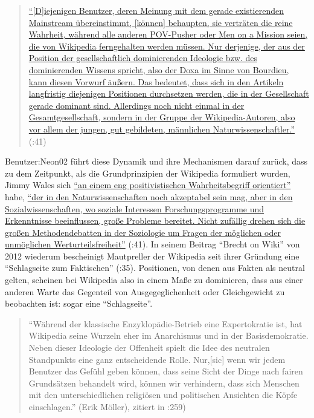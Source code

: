 \documentclass[fontsize=12pt]{scrartcl}
\begin{document}
\singlespacing
\begin{quote}
\href{https://commons.wikimedia.org/w/index.php?title=File:Allesueberwikipedia.pdf\&page=41}{"`[D]iejenigen Be\-nut\-zer, deren Meinung mit dem gerade existierenden Mainstream \"ubereinstimmt, [k\"onnen] behaupten, sie vertr\"aten die reine Wahrheit, w\"ahrend alle anderen \flq \href{https://de.wikipedia.org/wiki/Wikipedia:Neutraler_Standpunkt}{POV}-Pusher\frq \,\,oder \flq Men on a Mission\frq \,\,seien, die von Wi\-ki\-pe\-dia ferngehalten werden m\"ussen. Nur derjenige, der aus der Position der ge\-sell\-schaftlich dominierenden Ideologie bzw. des dominierenden Wissens spricht, also der Doxa im Sinne von Bourdieu, kann diesen Vorwurf \"au{\ss}ern. Das bedeutet, dass sich in den Artikeln langfristig diejenigen Positionen durchsetzen werden, die in der Ge\-sell\-schaft gerade dominant sind. Al\-ler\-dings noch nicht einmal in der Gesamtge\-sell\-schaft, sondern in der Gruppe der Wi\-ki\-pe\-dia-Autoren, also vor allem der jungen, gut gebildeten, m\"annlichen Naturwissenschaftler."'} (\cite{BenutzerNeon022011}:41)
\end{quote}
\onehalfspacing

Benutzer:Neon02 f\"uhrt diese Dynamik und ihre Mechanismen darauf zur\"uck, dass zu dem Zeitpunkt, als die Grundprinzipien der Wi\-ki\-pe\-dia formuliert wurden, Jimmy Wales sich \href{https://commons.wikimedia.org/w/index.php?title=File:Allesueberwikipedia.pdf\&page=41}{"`an einem eng positivistischen Wahrheitsbegriff orientiert"'} habe, \href{https://commons.wikimedia.org/w/index.php?title=File:Allesueberwikipedia.pdf\&page=41}{"`der in den Naturwissenschaften noch akzeptabel sein mag, aber in den Sozialwissenschaften, wo soziale Interessen For\-schungsprogramme und Erkenntnisse beeinflussen, gro{\ss}e Pro\-ble\-me bereitet. Nicht zuf\"allig drehen sich die gro{\ss}en Methodendebatten in der Soziologie um Fragen der m\"oglichen oder unm\"oglichen Werturteilsfreiheit"'} (\cite{BenutzerNeon022011}:41). In seinem Beitrag "`Brecht on Wiki"' von 2012 wiederum bescheinigt Mautpreller der Wi\-ki\-pe\-dia seit ihrer Gr\"undung eine "`Schlagseite zum \flq Faktischen\frq"' (\cite{Mautpreller2012}:35). Positionen, von denen aus Fakten als neutral gelten, scheinen bei Wi\-ki\-pe\-dia also in einem Ma{\ss}e zu dominieren, dass aus einer anderen Warte das Gegenteil von Ausgegeglichenheit oder Gleichgewicht zu beobachten ist: sogar eine "`Schlagseite"'.

\singlespacing
\begin{quote}
"`W\"ahrend der klassische Enzyklop\"adie-Betrieb eine Expertokratie ist, hat Wi\-ki\-pe\-dia seine Wurzeln eher im Anarchismus und in der Basisdemokratie.\\ Neben dieser Ideologie der Offenheit spielt die Idee des neutralen Standpunkts eine ganz entscheidende Rolle. Nur,[sic] wenn wir jedem Be\-nut\-zer das Ge\-f\"uhl geben k\"onnen, dass seine Sicht der Dinge nach fairen Grunds\"atzen behandelt wird, k\"onnen wir verhindern, dass sich Menschen mit den unterschiedlichen religi\"osen und politischen Ansichten die K\"opfe einschlagen."' (Erik M\"oller), zitiert in \cite{SchliekerLehmann2007}:259)
\end{quote} 
\onehalfspacing 
\end{document}
